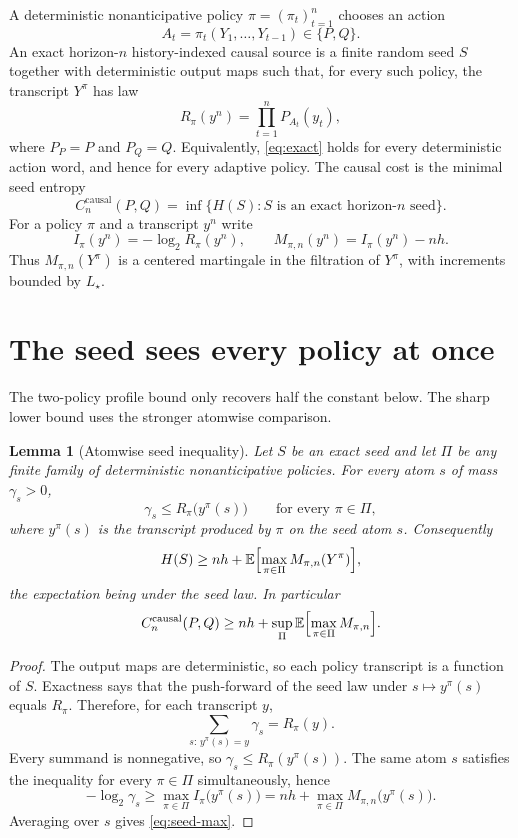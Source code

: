 \documentclass[11pt]{article}
\newtheorem{lemma}[theorem]{Lemma}
\theoremstyle{definition}
\newcommand{\causal}{\mathrm{causal}}
\newcommand{\E}{\mathbb{E}}
\begin{document}
A deterministic nonanticipative policy \(\pi=(\pi_t)_{t=1}^n\) chooses an action
\[
  A_t=\pi_t(Y_1,\ldots,Y_{t-1})\in\{P,Q\}.
\]
An exact horizon-\(n\) history-indexed causal source is a finite random seed \(S\) together with deterministic output maps such that, for every such policy, the transcript \(Y^\pi\) has law
\begin{equation}
  \label{eq:exact}
  R_\pi(y^n)=\prod_{t=1}^n P_{A_t}(y_t),
\end{equation}
where \(P_P=P\) and \(P_Q=Q\).
Equivalently, \eqref{eq:exact} holds for every deterministic action word, and hence for every adaptive policy.
The causal cost is the minimal seed entropy
\[
  C_n^{\causal}(P,Q)=\inf\bigl\{H(S):S\text{ is an exact horizon-\(n\) seed}\bigr\}.
\]
For a policy \(\pi\) and a transcript \(y^n\) write
\[
  I_\pi(y^n)=-\log_2 R_\pi(y^n),\qquad
  M_{\pi,n}(y^n)=I_\pi(y^n)-nh.
\]
Thus \(M_{\pi,n}(Y^\pi)\) is a centered martingale in the filtration of \(Y^\pi\), with increments bounded by \(L_\star\).

\section{The seed sees every policy at once}
\label{sec:seed}

The two-policy profile bound only recovers half the constant below.
The sharp lower bound uses the stronger atomwise comparison.

\begin{lemma}[Atomwise seed inequality]
\label{lem:atom}
Let \(S\) be an exact seed and let \(\Pi\) be any finite family of deterministic nonanticipative policies.
For every atom \(s\) of mass \(\gamma_s>0\),
\[
  \gamma_s\le R_\pi\bigl(y^\pi(s)\bigr)
  \qquad\text{for every }\pi\in\Pi,
\]
where \(y^\pi(s)\) is the transcript produced by \(\pi\) on the seed atom \(s\).
Consequently
\begin{equation}
  \label{eq:seed-max}
  H(S)\ge nh+\E\Bigl[\max_{\pi\in\Pi} M_{\pi,n}(Y^\pi)\Bigr],
\end{equation}
the expectation being under the seed law.
In particular
\[
  C_n^{\causal}(P,Q)
  \ge
  nh+\sup_{\Pi}\E\Bigl[\max_{\pi\in\Pi} M_{\pi,n}\Bigr].
\]
\end{lemma}

\begin{proof}
The output maps are deterministic, so each policy transcript is a function of \(S\).
Exactness says that the push-forward of the seed law under \(s\mapsto y^\pi(s)\) equals \(R_\pi\).
Therefore, for each transcript \(y\),
\[
  \sum_{s:\,y^\pi(s)=y}\gamma_s=R_\pi(y).
\]
Every summand is nonnegative, so \(\gamma_s\le R_\pi(y^\pi(s))\).
The same atom \(s\) satisfies the inequality for every \(\pi\in\Pi\) simultaneously, hence
\[
  -\log_2\gamma_s
  \ge
  \max_{\pi\in\Pi} I_\pi\bigl(y^\pi(s)\bigr)
  =
  nh+\max_{\pi\in\Pi} M_{\pi,n}\bigl(y^\pi(s)\bigr).
\]
Averaging over \(s\) gives \eqref{eq:seed-max}.
\end{proof}
\end{document}
